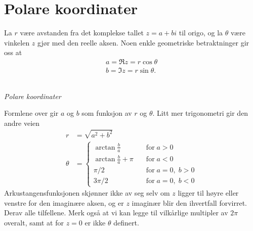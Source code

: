 \section*{Polare koordinater}
La $r$ være avstanden fra det komplekse tallet $z=a+bi$ til origo, 
og la $\theta$ være vinkelen $z$ gjør med den reelle aksen. 
Noen enkle geometriske betraktninger gir oss at 
\begin{align*}
a=\Re z = r\cos \theta \\
b=\Im z = r\sin \theta.
\end{align*}
\begin{center}
\\
{\small \textit{Polare koordinater}}
\end{center}
Formlene over gir $a$ og $b$ som funksjon av $r$ og $\theta$. 
Litt mer trigonometri gir den andre veien
\begin{align*}
r&=\sqrt{a^2+b^2} \\
\theta&= \begin{cases} \arctan \frac{b}{a} \quad &\text{for}\; a>0\\ \arctan \frac{b}{a} + \pi \quad &\text{for}\;  a<0 \\  \pi/2 \quad &\text{for}\;  a=0, \; b>0 \\ 3\pi/2 \quad &\text{for}\;  a=0, \; b<0  \end{cases}
\end{align*}
Arkustangensfunksjonen skjønner ikke av seg selv om 
$z$ ligger til høyre eller venstre for den imaginære aksen, 
og er $z$ imaginær blir den ihvertfall forvirret. Derav alle tilfellene.
 Merk også at vi kan legge til vilkårlige multipler av $2\pi$ overalt, samt at for $z=0$ er ikke $\theta$ definert.
 
